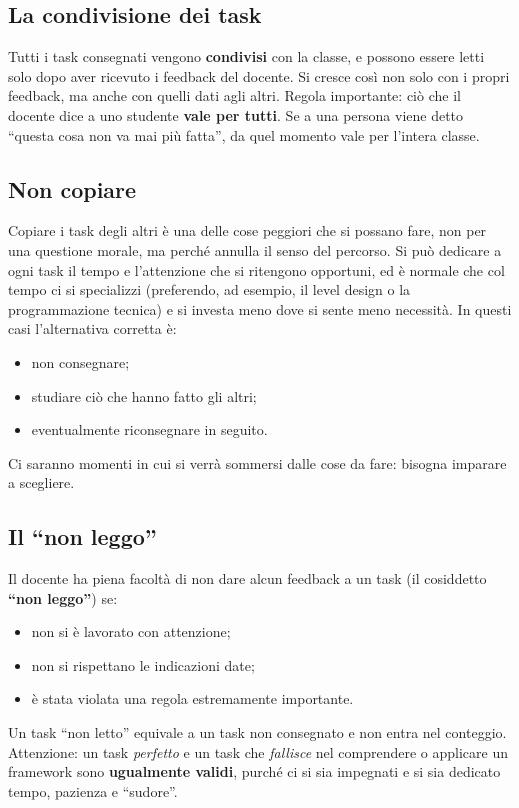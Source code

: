 \subsection{La condivisione dei task}

Tutti i task consegnati vengono \textbf{condivisi} con la classe, e possono
essere letti solo dopo aver ricevuto i feedback del docente. Si cresce così
non solo con i propri feedback, ma anche con quelli dati agli altri. Regola
importante: ciò che il docente dice a uno studente \textbf{vale per tutti}. Se
a una persona viene detto ``questa cosa non va mai più fatta'', da quel
momento vale per l'intera classe.

\subsection{Non copiare}

Copiare i task degli altri è una delle cose peggiori che si possano fare, non
per una questione morale, ma perché annulla il senso del percorso. Si può
dedicare a ogni task il tempo e l'attenzione che si ritengono opportuni, ed è
normale che col tempo ci si specializzi (preferendo, ad esempio, il level
design o la programmazione tecnica) e si investa meno dove si sente meno
necessità. In questi casi l'alternativa corretta è:
\begin{itemize}
  \item non consegnare;
  \item studiare ciò che hanno fatto gli altri;
  \item eventualmente riconsegnare in seguito.
\end{itemize}
Ci saranno momenti in cui si verrà sommersi dalle cose da fare: bisogna
imparare a scegliere.

\subsection{Il ``non leggo''}

Il docente ha piena facoltà di non dare alcun feedback a un task (il
cosiddetto \textbf{``non leggo''}) se:
\begin{itemize}
  \item non si è lavorato con attenzione;
  \item non si rispettano le indicazioni date;
  \item è stata violata una regola estremamente importante.
\end{itemize}
Un task ``non letto'' equivale a un task non consegnato e non entra nel
conteggio. Attenzione: un task \emph{perfetto} e un task che \emph{fallisce}
nel comprendere o applicare un framework sono \textbf{ugualmente validi},
purché ci si sia impegnati e si sia dedicato tempo, pazienza e ``sudore''.

